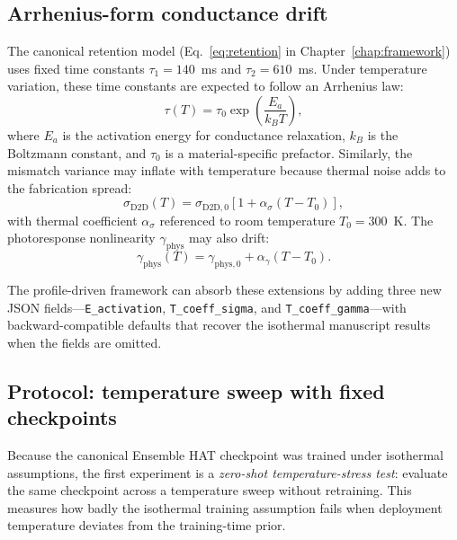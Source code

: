 \subsection{Arrhenius-form conductance drift}

The canonical retention model (Eq.~\ref{eq:retention} in Chapter~\ref{chap:framework}) uses fixed time constants $\tau_{1}=140$~ms and $\tau_{2}=610$~ms.  Under temperature variation, these time constants are expected to follow an Arrhenius law:
\begin{equation}
    \tau(T) = \tau_{0} \exp\!\left(\frac{E_{a}}{k_{B} T}\right),
    \label{eq:arrhenius-tau}
\end{equation}
where $E_{a}$ is the activation energy for conductance relaxation, $k_{B}$ is the Boltzmann constant, and $\tau_{0}$ is a material-specific prefactor.  Similarly, the mismatch variance may inflate with temperature because thermal noise adds to the fabrication spread:
\begin{equation}
    \sigma_{\text{D2D}}(T) = \sigma_{\text{D2D},0} \left[1 + \alpha_{\sigma}(T - T_{0})\right],
    \label{eq:thermal-sigma}
\end{equation}
with thermal coefficient $\alpha_{\sigma}$ referenced to room temperature $T_{0}=300$~K.  The photoresponse nonlinearity $\gamma_{\text{phys}}$ may also drift:
\begin{equation}
    \gamma_{\text{phys}}(T) = \gamma_{\text{phys},0} + \alpha_{\gamma}(T - T_{0}).
    \label{eq:thermal-gamma}
\end{equation}

The profile-driven framework can absorb these extensions by adding three new JSON fields---\texttt{E\_activation}, \texttt{T\_coeff\_sigma}, and \texttt{T\_coeff\_gamma}---with backward-compatible defaults that recover the isothermal manuscript results when the fields are omitted.

\subsection{Protocol: temperature sweep with fixed checkpoints}

Because the canonical Ensemble HAT checkpoint was trained under isothermal assumptions, the first experiment is a \emph{zero-shot temperature-stress test}: evaluate the same checkpoint across a temperature sweep without retraining.  This measures how badly the isothermal training assumption fails when deployment temperature deviates from the training-time prior.

